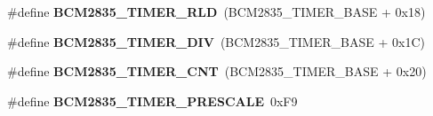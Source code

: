 \begin{DoxyCompactItemize}
\mbox{\label{group__raspberrypi__reg_gabc6ed24b0ee31da91c505288c3511a2c}} 
\#define {\bfseries B\+C\+M2835\+\_\+\+T\+I\+M\+E\+R\+\_\+\+R\+LD}~(B\+C\+M2835\+\_\+\+T\+I\+M\+E\+R\+\_\+\+B\+A\+SE + 0x18)
\item 
\mbox{\label{group__raspberrypi__reg_gadc88ce57a615e665943248cbe6ece84d}} 
\#define {\bfseries B\+C\+M2835\+\_\+\+T\+I\+M\+E\+R\+\_\+\+D\+IV}~(B\+C\+M2835\+\_\+\+T\+I\+M\+E\+R\+\_\+\+B\+A\+SE + 0x1\+C)
\item 
\mbox{\label{group__raspberrypi__reg_gae60fa82556d38aab9312e48cd45ad896}} 
\#define {\bfseries B\+C\+M2835\+\_\+\+T\+I\+M\+E\+R\+\_\+\+C\+NT}~(B\+C\+M2835\+\_\+\+T\+I\+M\+E\+R\+\_\+\+B\+A\+SE + 0x20)
\item 
\mbox{\label{group__raspberrypi__reg_ga2712fe38a58cfd15132dd6ec47b26933}} 
\#define {\bfseries B\+C\+M2835\+\_\+\+T\+I\+M\+E\+R\+\_\+\+P\+R\+E\+S\+C\+A\+LE}~0x\+F9
\end{DoxyCompactItemize}
